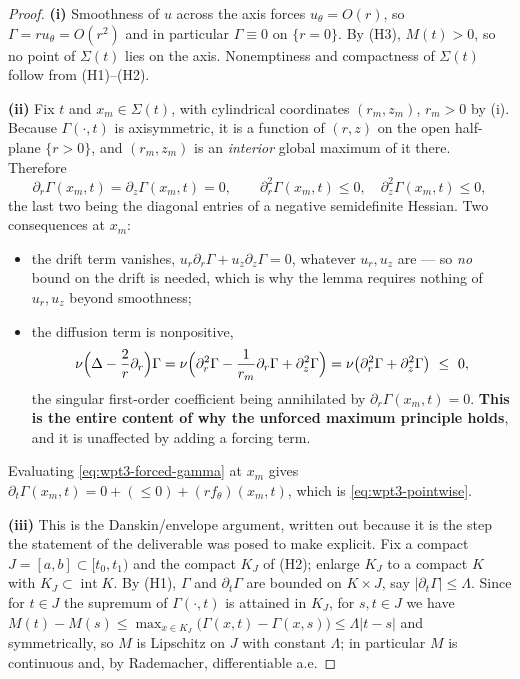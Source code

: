 \documentclass[11pt]{article}
\theoremstyle{definition}
\theoremstyle{remark}
\newcommand{\abs}[1]{\left|#1\right|}
\begin{document}
\begin{proof}
  \textbf{(i)} Smoothness of $u$ across the axis forces $u_\theta=O(r)$, so
  $\Gamma=ru_\theta=O(r^2)$ and in particular $\Gamma\equiv0$ on $\{r=0\}$.
  By (H3), $M(t)>0$, so no point of $\Sigma(t)$ lies on the axis.
  Nonemptiness and compactness of $\Sigma(t)$ follow from (H1)--(H2).

  \textbf{(ii)} Fix $t$ and $x_m\in\Sigma(t)$, with cylindrical coordinates
  $(r_m,z_m)$, $r_m>0$ by (i). Because $\Gamma(\cdot,t)$ is axisymmetric, it
  is a function of $(r,z)$ on the open half-plane $\{r>0\}$, and $(r_m,z_m)$
  is an \emph{interior} global maximum of it there. Therefore
  \[
    \partial_r\Gamma(x_m,t)=\partial_z\Gamma(x_m,t)=0,
    \qquad
    \partial_r^2\Gamma(x_m,t)\leq0,\quad
    \partial_z^2\Gamma(x_m,t)\leq0,
  \]
  the last two being the diagonal entries of a negative semidefinite Hessian.
  Two consequences at $x_m$:
  \begin{itemize}[leftmargin=2.2em]
    \item the drift term vanishes,
      $u_r\partial_r\Gamma+u_z\partial_z\Gamma=0$, whatever $u_r,u_z$ are ---
      so \emph{no} bound on the drift is needed, which is why the lemma
      requires nothing of $u_r,u_z$ beyond smoothness;
    \item the diffusion term is nonpositive,
      \[
        \nu\Bigl(\Delta-\frac2r\partial_r\Bigr)\Gamma
        =\nu\Bigl(\partial_r^2\Gamma-\frac{1}{r_m}\partial_r\Gamma
          +\partial_z^2\Gamma\Bigr)
        =\nu\bigl(\partial_r^2\Gamma+\partial_z^2\Gamma\bigr)\ \leq\ 0 ,
      \]
      the singular first-order coefficient being annihilated by
      $\partial_r\Gamma(x_m,t)=0$. \textbf{This is the entire content of why
      the unforced maximum principle holds}, and it is unaffected by adding
      a forcing term.
  \end{itemize}
  Evaluating \eqref{eq:wpt3-forced-gamma} at $x_m$ gives
  $\partial_t\Gamma(x_m,t)=0+(\leq0)+(rf_\theta)(x_m,t)$, which is
  \eqref{eq:wpt3-pointwise}.

  \textbf{(iii)} This is the Danskin/envelope argument, written out because
  it is the step the statement of the deliverable was posed to make explicit.
  Fix a compact $J=[a,b]\subset[t_0,t_1)$ and the compact $K_J$ of (H2);
  enlarge $K_J$ to a compact $K$ with $K_J\subset\operatorname{int}K$. By
  (H1), $\Gamma$ and $\partial_t\Gamma$ are bounded on $K\times J$, say
  $\abs{\partial_t\Gamma}\leq\Lambda$. Since for $t\in J$ the supremum of
  $\Gamma(\cdot,t)$ is attained in $K_J$, for $s,t\in J$ we have
  $M(t)-M(s)\leq\max_{x\in K_J}\bigl(\Gamma(x,t)-\Gamma(x,s)\bigr)
   \leq\Lambda\abs{t-s}$ and symmetrically, so $M$ is Lipschitz on $J$ with
  constant $\Lambda$; in particular $M$ is continuous and, by Rademacher,
  differentiable a.e.


\end{proof}
\end{document}
